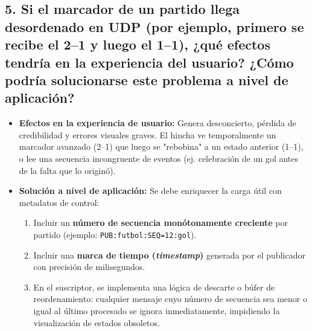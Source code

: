 \documentclass[11pt,a4paper]{article}
\begin{document}
\subsection{5. Si el marcador de un partido llega desordenado en UDP (por ejemplo, primero se recibe el 2--1 y luego el 1--1), ¿qué efectos tendría en la experiencia del usuario? ¿Cómo podría solucionarse este problema a nivel de aplicación?}
\begin{itemize}
    \item \textbf{Efectos en la experiencia de usuario:} Genera desconcierto, pérdida de credibilidad y errores visuales graves. El hincha ve temporalmente un marcador avanzado (2--1) que luego se "rebobina" a un estado anterior (1--1), o lee una secuencia incongruente de eventos (ej. celebración de un gol antes de la falta que lo originó).
    \item \textbf{Solución a nivel de aplicación:} Se debe enriquecer la carga útil con metadatos de control:
    \begin{enumerate}
        \item Incluir un \textbf{número de secuencia monótonamente creciente} por partido (ejemplo: \texttt{PUB:futbol:SEQ=12:gol}).
        \item Incluir una \textbf{marca de tiempo (\textit{timestamp})} generada por el publicador con precisión de milisegundos.
        \item En el suscriptor, se implementa una lógica de descarte o búfer de reordenamiento: cualquier mensaje cuyo número de secuencia sea menor o igual al último procesado se ignora inmediatamente, impidiendo la visualización de estados obsoletos.
    \end{enumerate}
\end{itemize}
\end{document}
